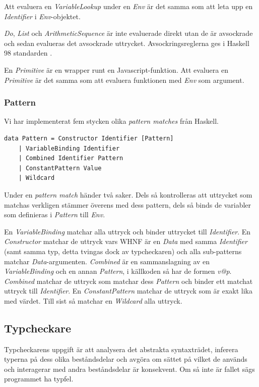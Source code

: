 Att evaluera en \emph{VariableLookup} under en \emph{Env} är det samma som att leta upp en \emph{Identifier} i \emph{Env}-objektet.

\emph{Do}, \emph{List} och \emph{ArithmeticSequence} är inte evaluerade direkt utan de är avsockrade och sedan evalueras det avsockrade uttrycket. Avsockringsreglerna ges i Haskell 98 standarden \citep{haskell98chap3}.

En \emph{Primitive} är en wrapper runt en Javascript-funktion. Att evaluera en \emph{Primitive} är det samma som att evaluera funktionen med \emph{Env} som argument.

\subsubsection{Pattern}
Vi har implementerat fem stycken olika \emph{pattern matches} från Haskell.
\begin{lstlisting}
data Pattern = Constructor Identifier [Pattern]
    | VariableBinding Identifier
    | Combined Identifier Pattern
    | ConstantPattern Value
    | Wildcard
\end{lstlisting}
Under en \emph{pattern match} händer två saker. Dels så kontrolleras att uttrycket som matchas verkligen stämmer överens med dess pattern, dels så binds de variabler som definieras i \emph{Pattern} till \emph{Env}. 

En \emph{VariableBinding} matchar alla uttryck och binder uttrycket till \emph{Identifier}. En \emph{Constructor} matchar de uttryck vars WHNF är en \emph{Data} med samma \emph{Identifier} (samt samma typ, detta tvingas dock av typcheckaren) och alla sub-patterns matchar \emph{Data}-argumenten. \emph{Combined} är en sammanslagning av en \emph{VariableBinding} och en annan \emph{Pattern}, i källkoden så har de formen \emph{v@p}. \emph{Combined} matchar de uttryck som matchar dess \emph{Pattern} och binder ett matchat uttryck till \emph{Identifier}. En \emph{ConstantPattern} matchar de uttryck som är exakt lika med värdet. Till sist så matchar en \emph{Wildcard} alla uttryck.

\subsection{Typcheckare} 
Typcheckarens uppgift är att analysera det abstrakta syntaxträdet, inferera typerna på dess olika
beståndsdelar och avgöra om sättet på vilket de används och interagerar med
andra beståndsdelar är konsekvent. Om så inte är fallet sägs programmet ha
typfel.

